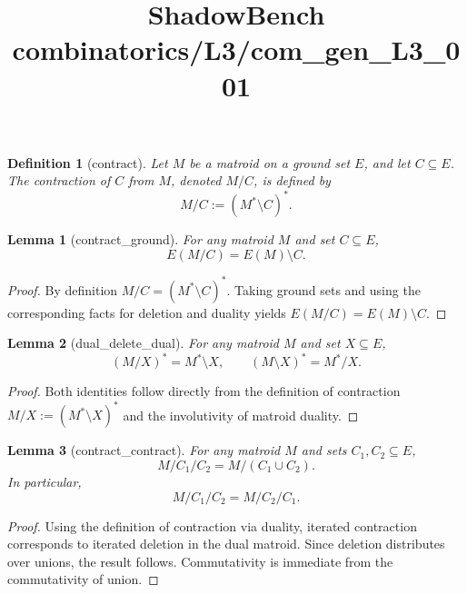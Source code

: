\documentclass{article}
\title{ShadowBench combinatorics/L3/com\_gen\_L3\_001}
\newtheorem{lemma}{Lemma}
\newtheorem{definition}{Definition}
\begin{document}
\maketitle

\begin{definition}[contract]
Let \( M \) be a matroid on a ground set \( E \), and let \( C \subseteq E \).
The \emph{contraction} of \( C \) from \( M \), denoted \( M / C \), is defined by
\[
M / C := (M^\ast \setminus C)^\ast .
\]
\end{definition}

\begin{lemma}[contract_ground]
For any matroid \( M \) and set \( C \subseteq E \),
\[
E(M / C) = E(M) \setminus C .
\]
\end{lemma}

\begin{proof}
By definition \( M / C = (M^\ast \setminus C)^\ast \).
Taking ground sets and using the corresponding facts for deletion and duality yields
\( E(M / C) = E(M) \setminus C \).
\end{proof}

\begin{lemma}[dual_delete_dual]
For any matroid \( M \) and set \( X \subseteq E \),
\[
(M / X)^\ast = M^\ast \setminus X,
\qquad
(M \setminus X)^\ast = M^\ast / X .
\]
\end{lemma}

\begin{proof}
Both identities follow directly from the definition of contraction
\( M / X := (M^\ast \setminus X)^\ast \) and the involutivity of matroid duality.
\end{proof}

\begin{lemma}[contract_contract]
For any matroid \( M \) and sets \( C_1, C_2 \subseteq E \),
\[
M / C_1 / C_2 = M / (C_1 \cup C_2).
\]
In particular,
\[
M / C_1 / C_2 = M / C_2 / C_1 .
\]
\end{lemma}

\begin{proof}
Using the definition of contraction via duality, iterated contraction corresponds to
iterated deletion in the dual matroid.
Since deletion distributes over unions, the result follows.
Commutativity is immediate from the commutativity of union.
\end{proof}
\end{document}
